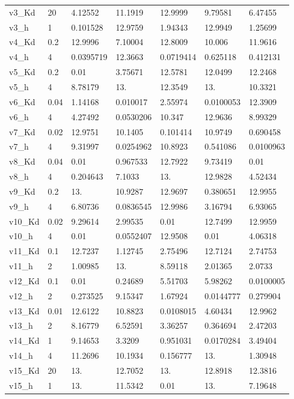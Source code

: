 \begin{tabular}{l|l|lllll}
v3\_Kd & 20 & 4.12552 & 11.1919 & 12.9999 & 9.79581 & 6.47455 \\ 
v3\_h & 1 & 0.101528 & 12.9759 & 1.94343 & 12.9949 & 1.25699 \\ 
v4\_Kd & 0.2 & 12.9996 & 7.10004 & 12.8009 & 10.006 & 11.9616 \\ 
v4\_h & 4 & 0.0395719 & 12.3663 & 0.0719414 & 0.625118 & 0.412131 \\ 
v5\_Kd & 0.2 & 0.01 & 3.75671 & 12.5781 & 12.0499 & 12.2468 \\ 
v5\_h & 4 & 8.78179 & 13. & 12.3549 & 13. & 10.3321 \\ 
v6\_Kd & 0.04 & 1.14168 & 0.010017 & 2.55974 & 0.0100053 & 12.3909 \\ 
v6\_h & 4 & 4.27492 & 0.0530206 & 10.347 & 12.9636 & 8.99329 \\ 
v7\_Kd & 0.02 & 12.9751 & 10.1405 & 0.101414 & 10.9749 & 0.690458 \\ 
v7\_h & 4 & 9.31997 & 0.0254962 & 10.8923 & 0.541086 & 0.0100963 \\ 
v8\_Kd & 0.04 & 0.01 & 0.967533 & 12.7922 & 9.73419 & 0.01 \\ 
v8\_h & 4 & 0.204643 & 7.1033 & 13. & 12.9828 & 4.52434 \\ 
v9\_Kd & 0.2 & 13. & 10.9287 & 12.9697 & 0.380651 & 12.9955 \\ 
v9\_h & 4 & 6.80736 & 0.0836545 & 12.9986 & 3.16794 & 6.93065 \\ 
v10\_Kd & 0.02 & 9.29614 & 2.99535 & 0.01 & 12.7499 & 12.9959 \\ 
v10\_h & 4 & 0.01 & 0.0552407 & 12.9508 & 0.01 & 4.06318 \\ 
v11\_Kd & 0.1 & 12.7237 & 1.12745 & 2.75496 & 12.7124 & 2.74753 \\ 
v11\_h & 2 & 1.00985 & 13. & 8.59118 & 2.01365 & 2.0733 \\ 
v12\_Kd & 0.1 & 0.01 & 0.24689 & 5.51703 & 5.98262 & 0.0100005 \\ 
v12\_h & 2 & 0.273525 & 9.15347 & 1.67924 & 0.0144777 & 0.279904 \\ 
v13\_Kd & 0.01 & 12.6122 & 10.8823 & 0.0108015 & 4.60434 & 12.9962 \\ 
v13\_h & 2 & 8.16779 & 6.52591 & 3.36257 & 0.364694 & 2.47203 \\ 
v14\_Kd & 1 & 9.14653 & 3.3209 & 0.951031 & 0.0170284 & 3.49404 \\ 
v14\_h & 4 & 11.2696 & 10.1934 & 0.156777 & 13. & 1.30948 \\ 
v15\_Kd & 20 & 13. & 12.7052 & 13. & 12.8918 & 12.3816 \\ 
v15\_h & 1 & 13. & 11.5342 & 0.01 & 13. & 7.19648
\end{tabular}
